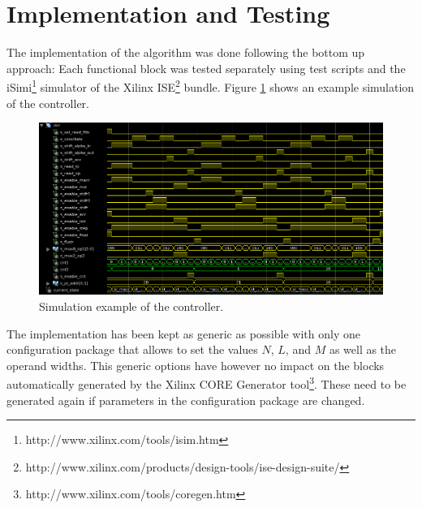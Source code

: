 \documentclass[mscthesis]{usiinfthesis}
\begin{document}
\section{Implementation and Testing}

The implementation of the algorithm was done following the bottom up
approach: Each functional block was tested separately using test scripts
and the iSimi\footnote{http://www.xilinx.com/tools/isim.htm} simulator of the
Xilinx
ISE\footnote{http://www.xilinx.com/products/design-tools/ise-design-suite/}
bundle. Figure \ref{fig:test_ctrl} shows an example simulation of the
controller.

\begin{figure}
    \includegraphics[width=1\columnwidth]{./schema/test_ctrl.png}
    \caption{Simulation example of the controller.}
    \label{fig:test_ctrl}
\end{figure}

The implementation has been kept as generic as possible with only one
configuration package that allows to set the values $N$, $L$, and $M$ as well as
the operand widths. This generic options have however no impact on the blocks
automatically generated by the Xilinx CORE Generator
tool\footnote{http://www.xilinx.com/tools/coregen.htm}. These need to be
generated again if parameters in the configuration package are changed.
\end{document}
